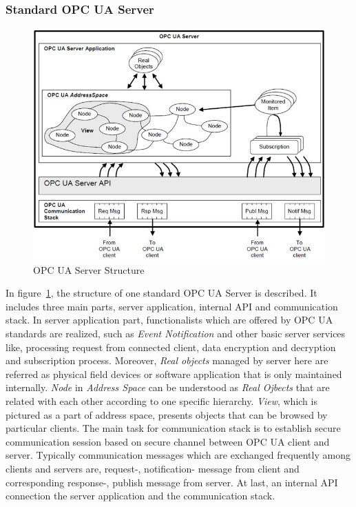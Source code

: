 \documentclass[]{llncs}
\begin{document}
\subsubsection{Standard OPC UA Server}
\begin{figure}[!htbp]
	\centering
	\includegraphics[width=1\textwidth]{server.jpg}
		\caption[ ]{OPC UA Server Structure\cite{O1}}
	\label{fig:server}
\end{figure}
In figure~\ref{fig:server}, the structure of one standard OPC UA Server is described. It includes three main parts, server application, internal API and communication stack. In server application part,  functionalists which are offered by OPC UA standards are realized, such as \emph{Event Notification} and other basic server services like, processing request from connected client, data encryption and decryption and subscription process. Moreover, \emph{Real objects} managed by server here are referred as physical field devices or software application that is only maintained internally. \emph{Node} in \emph{Address Space} can be understood as \emph{Real Ojbects} that are related with each other according to one specific hierarchy.  \emph{View}, which is pictured as a part of address space, presents objects that can be browsed by particular clients. The main  task for  communication stack  is to establish secure communication session based on secure channel between OPC UA client and server.   Typically communication messages which are exchanged frequently among clients and servers are, request-, notification- message from client and   corresponding   response-, publish message from server. At last, an internal API connection the server application and the communication stack.
\end{document}
